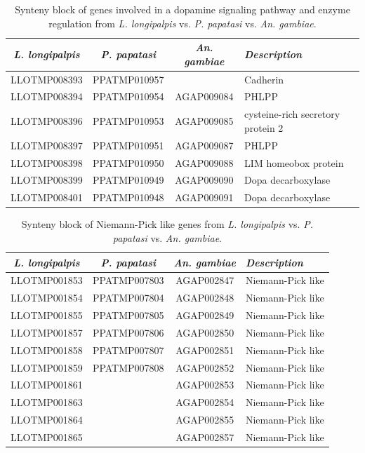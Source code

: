 \begin{table}[H]
  \centering
  \begin{tabular}{c c c l} \hline
    \emph{L. longipalpis} & \emph{P. papatasi} & \emph{An. gambiae} & \emph{Description} \\ \hline
    LLOTMP008393 & PPATMP010957 & & Cadherin \\
    LLOTMP008394 & PPATMP010954 & AGAP009084 & PHLPP \\
    LLOTMP008396 & PPATMP010953 & AGAP009085 & cysteine-rich secretory protein 2 \\
    LLOTMP008397 & PPATMP010951 & AGAP009087 & PHLPP \\
    LLOTMP008398 & PPATMP010950 & AGAP009088 & LIM homeobox protein \\
    LLOTMP008399 & PPATMP010949 & AGAP009090 & Dopa decarboxylase \\
    LLOTMP008401 & PPATMP010948 & AGAP009091 & Dopa decarboxylase
    \end{tabular}
    \caption{Synteny block of genes involved in a dopamine signaling pathway and enzyme regulation from \emph{L. longipalpis} vs. \emph{P. papatasi} vs. \emph{An. gambiae}.}
  \label{tab:synteny-three-way-dopamine}
\end{table}

\begin{table}[H]
  \centering
  \begin{tabular}{c c c l} \hline
    \emph{L. longipalpis} & \emph{P. papatasi} & \emph{An. gambiae} & \emph{Description} \\ \hline
    LLOTMP001853 & PPATMP007803 & AGAP002847 & Niemann-Pick like \\
    LLOTMP001854 & PPATMP007804 & AGAP002848 & Niemann-Pick like \\
    LLOTMP001855 & PPATMP007805 & AGAP002849 & Niemann-Pick like \\
    LLOTMP001857 & PPATMP007806 & AGAP002850 & Niemann-Pick like \\
    LLOTMP001858 & PPATMP007807 & AGAP002851 & Niemann-Pick like \\
    LLOTMP001859 & PPATMP007808 & AGAP002852 & Niemann-Pick like \\
    LLOTMP001861 & & AGAP002853 & Niemann-Pick like \\
    LLOTMP001863 & & AGAP002854 & Niemann-Pick like \\
    LLOTMP001864 & & AGAP002855 & Niemann-Pick like \\
    LLOTMP001865 & & AGAP002857 & Niemann-Pick like
    \end{tabular}
    \caption{Synteny block of Niemann-Pick like genes from \emph{L. longipalpis} vs. \emph{P. papatasi} vs. \emph{An. gambiae}.}
  \label{tab:synteny-three-way-np2}
\end{table}

